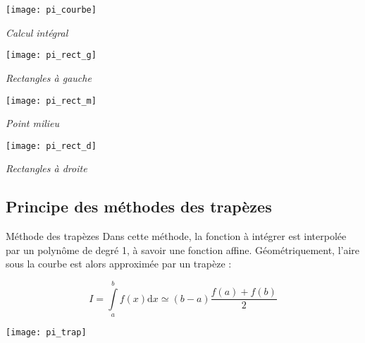 \begin{minipage}[c]{.24\linewidth}
\begin{center}
\texttt{[image: pi\_courbe]}

\textit{Calcul intégral}
\end{center}
\end{minipage}\hfill
\begin{minipage}[c]{.24\linewidth}
\begin{center}
\texttt{[image: pi\_rect\_g]}

\textit{Rectangles à gauche}
\end{center}
\end{minipage}\hfill
\begin{minipage}[c]{.24\linewidth}
\begin{center}
\texttt{[image: pi\_rect\_m]}

\textit{Point milieu}
\end{center}
\end{minipage}\hfill
\begin{minipage}[c]{.24\linewidth}
\begin{center}
\texttt{[image: pi\_rect\_d]}

\textit{Rectangles à droite}
\end{center}
\end{minipage}


\subsection{Principe des méthodes des trapèzes}
\begin{minipage}[c]{.7\linewidth}
\begin{defi}{Méthode des trapèzes}
Dans cette méthode, la fonction à intégrer est interpolée par un polynôme de degré 1, à savoir une fonction affine. Géométriquement, l'aire sous la courbe est alors approximée par un trapèze :

$$
I = \int\limits_a^{b} f(x) \mathrm{d}x \simeq \left(b-a\right) \dfrac{f(a)+f(b)}{2} 
$$
\end{defi}
\end{minipage}\hfill
\begin{minipage}[c]{.24\linewidth}
\begin{center}
\texttt{[image: pi\_trap]}
\end{center}
\end{minipage}

